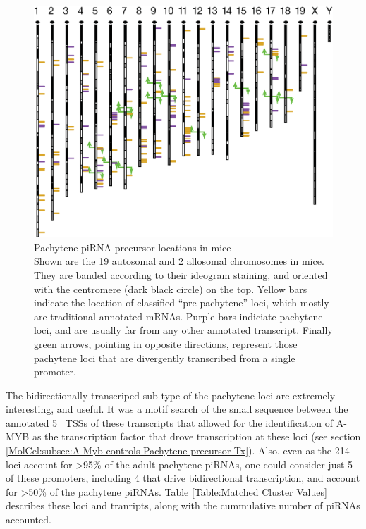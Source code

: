     \begin{figure} %
      \centering 
      \includegraphics{Figures/SeqZipMethod/PrecursorLocations.eps}
      \caption[Pachytene piRNA precursor locations in mice]
      {
        Pachytene piRNA precursor locations in mice\\[0.25cm]
        Shown are the 19 autosomal and 2 allosomal chromosomes in mice. They are banded according to their ideogram staining, and oriented with the centromere (dark black circle) on the top. Yellow bars indicate the location of classified ``pre-pachytene'' loci, which mostly are traditional annotated mRNAs. Purple bars indiciate pachytene loci, and are usually far from any other annotated transcript. Finally green arrows, pointing in opposite directions, represent those pachytene loci that are divergently transcribed from a single promoter.
     	 }
      \label{SeqZipMethod:fig:precursor Loci Locations}
      \end{figure}

    The bidirectionally-transcriped sub-type of the pachytene loci are extremely interesting, and useful. It was a motif search of the small sequence between the annotated 5\textprime~ TSSs of these transcripts that allowed for the identification of A-MYB as the transcription factor that drove transcription at these loci (see section \ref{MolCel:subsec:A-Myb controls Pachytene precursor Tx}). Also, even as the 214 loci account for >95\% of the adult pachytene piRNAs, one could consider just 5 of these promoters, including 4 that drive bidirectional transcription, and account for >50\% of the pachytene piRNAs. Table \ref{Table:Matched Cluster Values} describes these loci and tranripts, along with the cummulative number of piRNAs accounted.

